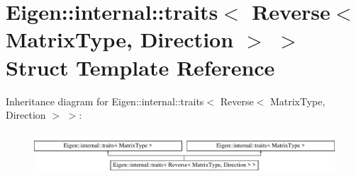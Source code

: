 \hypertarget{struct_eigen_1_1internal_1_1traits_3_01_reverse_3_01_matrix_type_00_01_direction_01_4_01_4}{}\section{Eigen\+:\+:internal\+:\+:traits$<$ Reverse$<$ Matrix\+Type, Direction $>$ $>$ Struct Template Reference}
\label{struct_eigen_1_1internal_1_1traits_3_01_reverse_3_01_matrix_type_00_01_direction_01_4_01_4}
Inheritance diagram for Eigen\+:\+:internal\+:\+:traits$<$ Reverse$<$ Matrix\+Type, Direction $>$ $>$\+:\begin{figure}[H]
\begin{center}
\leavevmode
\includegraphics[height=1.595442cm]{struct_eigen_1_1internal_1_1traits_3_01_reverse_3_01_matrix_type_00_01_direction_01_4_01_4}
\end{center}
\end{figure}
